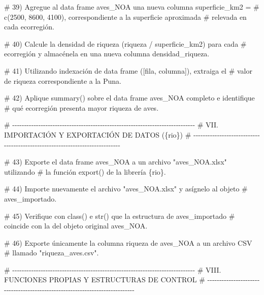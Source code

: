 \documentclass[
  spanish,
  letterpaper,
  DIV=11,
  numbers=noendperiod]{scrreprt}
\newenvironment{Shaded}{\begin{snugshade}}{\end{snugshade}}
\newcommand{\CommentTok}[1]{\textcolor[rgb]{0.37,0.37,0.37}{#1}}
\begin{document}
\begin{Shaded}
\begin{Highlighting}[]
\CommentTok{\# 39) Agregue al data frame \textquotesingle{}aves\_NOA\textquotesingle{} una nueva columna \textquotesingle{}superficie\_km2\textquotesingle{} =}
\CommentTok{\#     c(2500, 8600, 4100), correspondiente a la superficie aproximada}
\CommentTok{\#     relevada en cada ecorregión.}


\CommentTok{\# 40) Calcule la densidad de riqueza (riqueza / superficie\_km2) para cada}
\CommentTok{\#     ecorregión y almacénela en una nueva columna \textquotesingle{}densidad\_riqueza\textquotesingle{}.}


\CommentTok{\# 41) Utilizando indexación de data frame ([fila, columna]), extraiga el}
\CommentTok{\#     valor de riqueza correspondiente a la Puna.}


\CommentTok{\# 42) Aplique summary() sobre el data frame \textquotesingle{}aves\_NOA\textquotesingle{} completo e identifique}
\CommentTok{\#     qué ecorregión presenta mayor riqueza de aves.}

\CommentTok{\# {-}{-}{-}{-}{-}{-}{-}{-}{-}{-}{-}{-}{-}{-}{-}{-}{-}{-}{-}{-}{-}{-}{-}{-}{-}{-}{-}{-}{-}{-}{-}{-}{-}{-}{-}{-}{-}{-}{-}{-}{-}{-}{-}{-}{-}{-}{-}{-}{-}{-}{-}{-}{-}{-}{-}{-}{-}{-}{-}{-}{-}{-}{-}{-}{-}{-}{-}{-}{-}{-}{-}{-}{-}{-}{-}{-}{-}}
\CommentTok{\# VII. IMPORTACIÓN Y EXPORTACIÓN DE DATOS (\{rio\})}
\CommentTok{\# {-}{-}{-}{-}{-}{-}{-}{-}{-}{-}{-}{-}{-}{-}{-}{-}{-}{-}{-}{-}{-}{-}{-}{-}{-}{-}{-}{-}{-}{-}{-}{-}{-}{-}{-}{-}{-}{-}{-}{-}{-}{-}{-}{-}{-}{-}{-}{-}{-}{-}{-}{-}{-}{-}{-}{-}{-}{-}{-}{-}{-}{-}{-}{-}{-}{-}{-}{-}{-}{-}{-}{-}{-}{-}{-}{-}{-}}

\CommentTok{\# 43) Exporte el data frame \textquotesingle{}aves\_NOA\textquotesingle{} a un archivo "aves\_NOA.xlsx" utilizando}
\CommentTok{\#     la función export() de la librería \{rio\}.}


\CommentTok{\# 44) Importe nuevamente el archivo "aves\_NOA.xlsx" y asígnelo al objeto}
\CommentTok{\#     \textquotesingle{}aves\_importado\textquotesingle{}.}


\CommentTok{\# 45) Verifique con class() e str() que la estructura de \textquotesingle{}aves\_importado\textquotesingle{}}
\CommentTok{\#     coincide con la del objeto original \textquotesingle{}aves\_NOA\textquotesingle{}.}


\CommentTok{\# 46) Exporte únicamente la columna \textquotesingle{}riqueza\textquotesingle{} de \textquotesingle{}aves\_NOA\textquotesingle{} a un archivo CSV}
\CommentTok{\#     llamado "riqueza\_aves.csv".}

\CommentTok{\# {-}{-}{-}{-}{-}{-}{-}{-}{-}{-}{-}{-}{-}{-}{-}{-}{-}{-}{-}{-}{-}{-}{-}{-}{-}{-}{-}{-}{-}{-}{-}{-}{-}{-}{-}{-}{-}{-}{-}{-}{-}{-}{-}{-}{-}{-}{-}{-}{-}{-}{-}{-}{-}{-}{-}{-}{-}{-}{-}{-}{-}{-}{-}{-}{-}{-}{-}{-}{-}{-}{-}{-}{-}{-}{-}{-}{-}}
\CommentTok{\# VIII. FUNCIONES PROPIAS Y ESTRUCTURAS DE CONTROL}
\CommentTok{\# {-}{-}{-}{-}{-}{-}{-}{-}{-}{-}{-}{-}{-}{-}{-}{-}{-}{-}{-}{-}{-}{-}{-}{-}{-}{-}{-}{-}{-}{-}{-}{-}{-}{-}{-}{-}{-}{-}{-}{-}{-}{-}{-}{-}{-}{-}{-}{-}{-}{-}{-}{-}{-}{-}{-}{-}{-}{-}{-}{-}{-}{-}{-}{-}{-}{-}{-}{-}{-}{-}{-}{-}{-}{-}{-}{-}{-}}


\end{Highlighting}
\end{Shaded}
\end{document}
